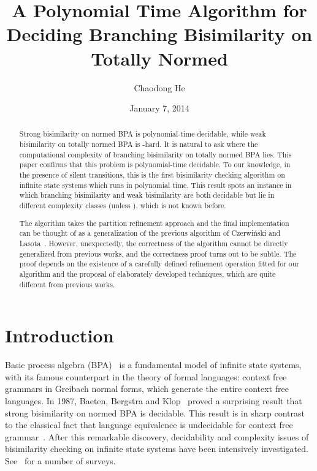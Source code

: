 \documentclass{llncs}
\title{A Polynomial Time Algorithm for Deciding Branching Bisimilarity on Totally Normed 
}
\author{Chaodong He}
\institute{BASICS, Department of Computer Science, Shanghai Jiao Tong University}
\date{January 7, 2014}
\begin{document}
\maketitle

\begin{abstract}
Strong bisimilarity on normed BPA is polynomial-time decidable, while weak bisimilarity on totally normed BPA is -hard.  It is natural to ask where the computational complexity of branching bisimilarity on totally normed BPA lies.  This paper confirms that this problem is polynomial-time decidable.  To our knowledge, in the presence of silent
transitions, this is the first bisimilarity checking algorithm on infinite state systems which runs in polynomial time.  This result spots an instance in which branching
bisimilarity and weak bisimilarity are both decidable but lie in different complexity classes (unless ), which is not known before.

The algorithm takes the partition refinement approach and the final implementation can be thought of as a generalization of the previous algorithm of Czerwi\'{n}ski and Lasota~\cite{DBLP:conf/fsttcs/CzerwinskiL10,CzerwinskiPhD}.  However, unexpectedly, the correctness of the algorithm cannot be directly generalized from previous works, and the correctness  proof turns out to be subtle.  The proof depends on the existence of a carefully defined refinement operation fitted for our algorithm and the proposal of elaborately developed techniques, which are quite different from previous works.
\end{abstract}

\section{Introduction}

Basic process algebra (BPA)~\cite{Baeten:1991:PA:103272} is a fundamental model of infinite state systems, with its famous counterpart in the theory of formal languages: context free grammars in Greibach normal forms, which generate the entire context free languages.
In 1987, Baeten, Bergstra and Klop~\cite{BaetenBergstraKlop1987,DBLP:journals/jacm/BaetenBK93} proved a
surprising result that strong bisimilarity on normed BPA is decidable.  This result is in sharp contrast to the classical fact that language equivalence is undecidable for context free grammar~\cite{Hopcroft:1990:IAT:574901}.
After this remarkable discovery, decidability and complexity issues of bisimilarity checking on infinite state systems have been intensively investigated. See~\cite{DBLP:conf/concur/JancarM99,Burkart00verificationon,DBLP:journals/iandc/MollerSS04,Srba2004,Kucera2006}
for a number of surveys.
\end{document}
